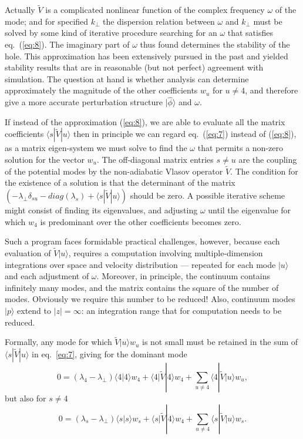 \documentclass[12pt]{article}
\def\ket#1{|#1\rangle}
\def\bra#1{\langle#1}
\begin{document}
Actually $\tilde{V}$ is a complicated nonlinear function of the complex
frequency $\omega$ of the mode; and for specified $k_\perp$ the
dispersion relation between $\omega$ and $k_\perp$ must be solved by
some kind of iterative procedure searching for an $\omega$ that
satisfies eq.\ (\ref{eq:8}). The imaginary part of $\omega$ thus found
determines the stability of the hole. This approximation has been
extensively pursued in the past and yielded stability results
that are in reasonable (but not perfect) agreement with simulation.
The question at hand is whether analysis can determine approximately
the magnitude of the other coefficients $w_u$ for $u\not=4$, and
therefore give a more accurate perturbation structure $\ket{\hat\phi}$
and $\omega$.

If instead of the approximation (\ref{eq:8}), we are able to evaluate all the
matrix coefficients $\bra{s}|\tilde{V}\ket{u}$ then in principle we can regard eq.\
(\ref{eq:7}) instead of (\ref{eq:8}), as a matrix eigen-system we must
solve to find the $\omega$ that permits a non-zero solution for the
vector $w_u$. The off-diagonal matrix entries $s\not=u$ are the
coupling of the potential modes by the non-adiabatic Vlasov operator
$\tilde{V}$.  The condition for the existence of a solution is that the
determinant of the matrix
$(-\lambda_\perp\delta_{su}-diag(\lambda_s)+\bra{s}|\tilde{V}\ket{u})$ should
be zero. A possible iterative scheme might consist of finding its
eigenvalues, and adjusting $\omega$ until the eigenvalue for which
$w_4$ is predominant over the other coefficients becomes zero.

Such a program faces formidable practical challenges, however, because
each evaluation of $\tilde{V}\ket{u}$, requires a computation involving
multiple-dimension integrations over space and velocity distribution
--- repeated for each mode $\ket{u}$ and each adjustment of $\omega$.
Moreover, in principle, the continuum contains infinitely many modes,
and the matrix contains the square of the number of modes.  Obviously
we require this number to be reduced! Also, continuum modes $\ket{p}$
extend to $|z|=\infty$: an integration range that for computation
needs to be reduced.

Formally, any mode for which $\tilde{V}\ket{u}w_u$ is not small
must be retained in the sum of $\bra{s}|\tilde{V}\ket{u}$ in eq.\
\ref{eq:7}, giving for the dominant mode
\begin{equation}
  \label{eq:9}
  0=(\lambda_4-\lambda_\perp)\bra{4}\ket{4}w_4+\bra{4}|\tilde{V}\ket{4}w_4+\sum_{u\not=4}\bra{4}|\tilde{V}\ket{u}w_u,
\end{equation}
but also for $s\not=4$
\begin{equation}
  \label{eq:10}
 0=(\lambda_s-\lambda_\perp)\bra{s}\ket{s}w_s+\bra{s}|\tilde{V}\ket{4}w_4+\sum_{u\not=4}\bra{s}|\tilde{V}\ket{u}w_s.
\end{equation}
\end{document}
